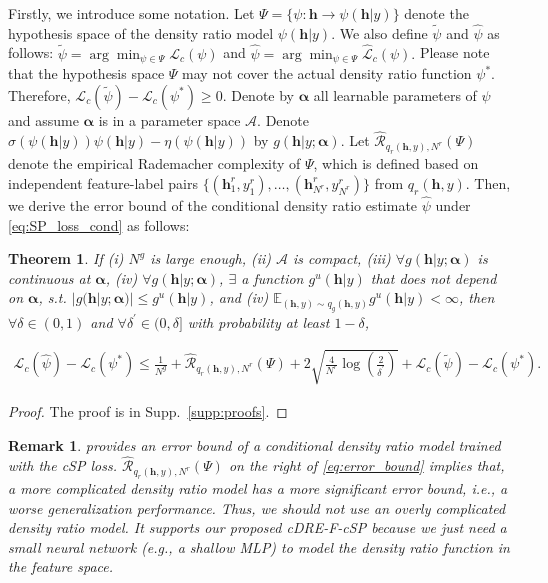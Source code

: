 \documentclass[final,12pt, 3p,times]{elsarticle}
\newtheorem{theorem}{Theorem}
\newtheorem{remark}{Remark}
\begin{document}
Firstly, we introduce some notation. Let $\Psi=\{ \psi: \bm{h}\rightarrow \psi(\bm{h}|y) \}$ denote the hypothesis space of the density ratio model $\psi(\bm{h}|y)$. We also define $\tilde{\psi}$ and $\hat{\psi}$ as follows:
$\tilde{\psi}=\arg\min_{\psi\in\Psi}\mathcal{L}_c(\psi)$ and $ \hat{\psi}=\arg\min_{\psi\in\Psi}\widehat{\mathcal{L}}_c(\psi).$
Please note that the hypothesis space $\Psi$ may not cover the actual density ratio function $\psi^*$. Therefore, $\mathcal{L}_c(\tilde{\psi})-\mathcal{L}_c(\psi^*)\geq 0$. Denote by $\bm{\alpha}$ all learnable parameters of $\psi$ and assume $\bm{\alpha}$ is in a parameter space $\mathcal{A}$. Denote $\sigma(\psi(\bm{h}|y))\psi(\bm{h}|y)-\eta(\psi(\bm{h}|y))$ by $g(\bm{h}|y;\bm{\alpha})$. Let $\hat{\mathcal{R}}_{q_r(\bm{h},y),N^r}(\Psi)$ denote the empirical Rademacher complexity \cite{mohri2018foundations} of $\Psi$, which is defined based on independent feature-label pairs $\{ (\bm{h}_1^r,y_1^r), \dots, (\bm{h}_{N^r}^r,y_{N^r}^r) \}$ from $q_r(\bm{h},y)$. Then,
we derive the error bound of the conditional density ratio estimate $\hat{\psi}$ under \cref{eq:SP_loss_cond} as follows:
\begin{theorem}
	\label{thm:error_bound}
	If (i) $N^g$ is large enough, (ii) $\mathcal{A}$ is compact, (iii) $\forall g(\bm{h}|y; \bm{\alpha})$ is continuous at $\bm{\alpha}$, (iv) $\forall g(\bm{h}|y; \bm{\alpha})$, $\exists$ a function $g^u(\bm{h}|y)$ that does not depend on $\bm{\alpha}$, s.t. $|g(\bm{h}|y;\bm{\alpha})|\leq g^u(\bm{h}|y)$, and (iv) $\mathbb{E}_{(\bm{h},y)\sim q_g(\bm{h},y)}g^u(\bm{h}|y)<\infty$, then $\forall \delta\in(0,1)$ and $\forall \delta^\prime\in(0,\delta]$ with probability at least $1-\delta$,


    \begin{align}
		\mathcal{L}_c(\hat{\psi})-\mathcal{L}_c(\psi^*)  \leq \frac{1}{N^g} + \hat{\mathcal{R}}_{q_r(\bm{h},y),N^r}(\Psi) + 2\sqrt{\frac{4}{N^r}\log\left(\frac{2}{\delta^\prime}\right)} + \mathcal{L}_c(\tilde{\psi})-\mathcal{L}_c(\psi^*).
		\label{eq:error_bound}
	\end{align}
\end{theorem}

\begin{proof}
	The proof is in Supp.\ \ref{supp:proofs}.
\end{proof}


\begin{remark}
     provides an error bound of a conditional density ratio model trained with the cSP loss.  $\hat{\mathcal{R}}_{q_r(\bm{h},y),N^r}(\Psi)$ on the right of \cref{eq:error_bound} implies that, a more complicated density ratio model has a more significant error bound, i.e., a worse generalization performance. Thus, we should not use an overly complicated density ratio model. It supports our proposed cDRE-F-cSP because we just need a small neural network (e.g., a shallow MLP) to model the density ratio function in the feature space.
\end{remark}
\end{document}

